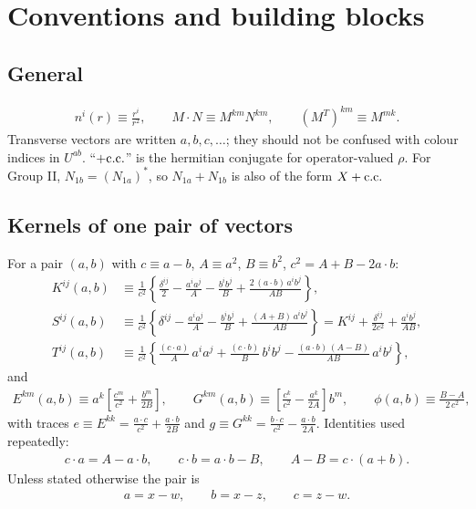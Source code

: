 \documentclass[10pt]{article}
\numberwithin{equation}{section}
\begin{document}
\section{Conventions and building blocks}\label{sec:conv}

\subsection{General}
\begin{align}
n^{i}(r)\equiv\frac{r^{i}}{r^{2}},\qquad M\cdot N\equiv M^{km}N^{km},\qquad (M^{T})^{km}\equiv M^{mk}.
\end{align}
Transverse vectors are written $a,b,c,\dots$; they should not be confused with colour indices in $U^{ab}$. ``$+{\rm c.c.}$'' is the hermitian conjugate for operator-valued $\rho$. For Group II, $N_{1b}=(N_{1a})^{*}$, so $N_{1a}+N_{1b}$ is also of the form $X+{\rm c.c.}$

\subsection{Kernels of one pair of vectors}
For a pair $(a,b)$ with $c\equiv a-b$, $A\equiv a^{2}$, $B\equiv b^{2}$, $c^{2}=A+B-2a\cdot b$:
\begin{align}
K^{ij}(a,b)&\equiv\frac{1}{c^{2}}\left\{\frac{\delta^{ij}}{2}-\frac{a^{i}a^{j}}{A}-\frac{b^{i}b^{j}}{B}+\frac{2\,(a\cdot b)\,a^{i}b^{j}}{AB}\right\}, \label{eq:K}\\
S^{ij}(a,b)&\equiv\frac{1}{c^{2}}\left\{\delta^{ij}-\frac{a^{i}a^{j}}{A}-\frac{b^{i}b^{j}}{B}+\frac{(A+B)\,a^{i}b^{j}}{AB}\right\}=K^{ij}+\frac{\delta^{ij}}{2c^{2}}+\frac{a^{i}b^{j}}{AB}, \label{eq:S}\\
T^{ij}(a,b)&\equiv\frac{1}{c^{2}}\left\{\frac{(c\cdot a)}{A}\,a^{i}a^{j}+\frac{(c\cdot b)}{B}\,b^{i}b^{j}-\frac{(a\cdot b)\,(A-B)}{AB}\,a^{i}b^{j}\right\}, \label{eq:T}
\end{align}
and
\begin{align}
E^{km}(a,b)\equiv a^{k}\left[\frac{c^{m}}{c^{2}}+\frac{b^{m}}{2B}\right],\qquad
G^{km}(a,b)\equiv\left[\frac{c^{k}}{c^{2}}-\frac{a^{k}}{2A}\right]b^{m},\qquad
\phi(a,b)\equiv\frac{B-A}{2\,c^{2}}, \label{eq:blocks}
\end{align}
with traces $e\equiv E^{kk}=\frac{a\cdot c}{c^{2}}+\frac{a\cdot b}{2B}$ and $g\equiv G^{kk}=\frac{b\cdot c}{c^{2}}-\frac{a\cdot b}{2A}$. Identities used repeatedly:
\begin{align}
c\cdot a=A-a\cdot b,\qquad c\cdot b=a\cdot b-B,\qquad A-B=c\cdot(a+b). \label{eq:ids}
\end{align}
Unless stated otherwise the pair is
\begin{align}
a=x-w,\qquad b=x-z,\qquad c=z-w .
\end{align}
\end{document}

